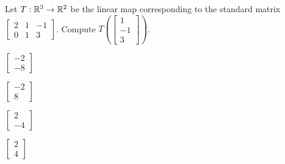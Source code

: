 \begin{readinessAssuranceTest}
\item Let \(T: \mathbb{R}^3 \rightarrow \mathbb{R}^2\) be the linear map corresponding to the standard matrix \(\begin{bmatrix} 2 & 1 & -1 \\ 0 & 1 & 3  \end{bmatrix} \).  Compute \(T\left(\begin{bmatrix} 1 \\ -1 \\ 3 \end{bmatrix} \right)\).
\begin{multicols}{4}
\begin{readinessAssuranceTestChoices}
\item $\begin{bmatrix} -2 \\ -8  \end{bmatrix}$
\item $\begin{bmatrix}  -2 \\ 8 \end{bmatrix}$ %
\item $\begin{bmatrix} 2 \\ -4 \end{bmatrix}$
\item $\begin{bmatrix}  2 \\ 4 \end{bmatrix}$ 
\end{readinessAssuranceTestChoices}
\end{multicols}


\end{readinessAssuranceTest}
